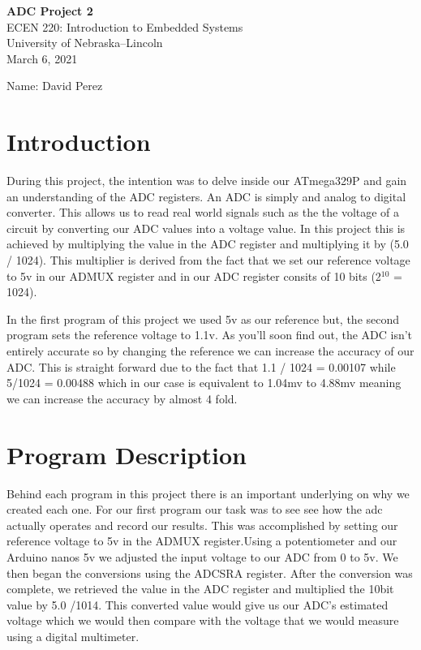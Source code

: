 \documentclass[11pt,pdftex,portrait,letterpaper]{article}
\begin{document}
	
	\vspace*{30ex}
	\begin{center}
		
		\textbf{ADC Project 2}\\
		
		\vspace{4ex}
		ECEN 220: Introduction to Embedded Systems\\
		University of Nebraska--Lincoln\\
		March 6, 2021
		
		\vspace{4ex}
		Name: David Perez\\
		
	\end{center}
	
	
	\pagebreak
	\tableofcontents
	\pagebreak
	
	
	\section{Introduction}

	During this project, the intention was to delve inside our ATmega329P and gain an understanding of the ADC registers. An ADC is simply and analog to digital converter. This allows us to read real world signals such as the the voltage of a circuit by converting our ADC values into a voltage value. In this project this is achieved by multiplying the value in the ADC register and multiplying it by (5.0 / 1024).  This multiplier is derived from the fact that we set our reference voltage to 5v in our ADMUX register and in our ADC register consits of 10 bits (2$^{10}$ = 1024).
	
	In the first program of this project we used 5v as our reference but, the second program sets the reference voltage to 1.1v. As you'll soon find out, the ADC isn't entirely accurate so by changing the reference we can increase the accuracy of our ADC. This is straight forward due to the fact that 1.1 / 1024 = 0.00107 while 5/1024 = 0.00488 which in our case is equivalent to 1.04mv to 4.88mv meaning we can increase the accuracy by almost 4 fold.
	
	
		\section{Program Description}
	

	
	Behind each program in this project there is an important underlying on why we created each one. For our first program our task was to see see how the adc actually operates and record our results. This was accomplished by setting our reference voltage  to 5v in the ADMUX register.Using a potentiometer and our Arduino nanos 5v we adjusted the input voltage to our ADC from 0 to 5v. We then began the conversions using the ADCSRA	register. After the conversion was complete, we retrieved the value in the ADC register and multiplied the 10bit value by 5.0 /1014. This converted value would give us our ADC's estimated voltage which we would then compare with the voltage that we would measure using a digital multimeter.
	
\end{document}
